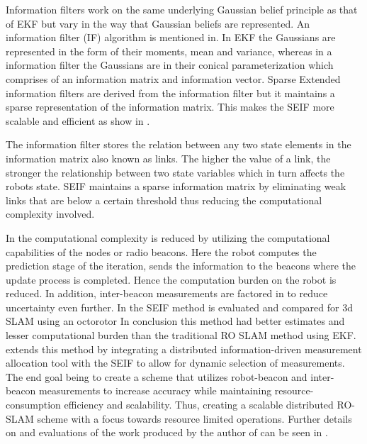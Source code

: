 \documentclass[conference]{IEEEtran}
\begin{document}
	Information filters work on the same underlying Gaussian belief principle as that of EKF but vary in the way that Gaussian beliefs are represented. An information filter (IF) algorithm is mentioned in\cite{Torres-Gonzalez2014}. In EKF the Gaussians are represented in the form of their moments, mean and variance, whereas in a information filter the Gaussians are in their conical parameterization which comprises of an information matrix and information vector. 
	Sparse Extended information filters are derived from the  information filter but it maintains a sparse representation of the information matrix. This makes the SEIF more scalable and efficient as show in \cite{Torres-Gonzalez2014}.

	The information filter stores the relation between any two state elements in the information matrix also known as links. The higher the value of a link, the stronger the relationship between two state variables which in turn affects the robots state. SEIF maintains a sparse information matrix by eliminating weak links that are below a certain threshold thus reducing the computational complexity involved.

	In \cite{Torres-Gonzalez2014} the computational complexity is reduced by utilizing the computational capabilities of the nodes or radio  beacons. Here the robot computes the prediction stage of the iteration, sends the information to the beacons where the update process is completed. Hence the computation burden on the robot is reduced. In addition, inter-beacon measurements are factored in to reduce uncertainty even further. In \cite{Torres-Gonzalez2017} the SEIF method is evaluated and compared for 3d SLAM using an octorotor In conclusion this method had better estimates and lesser computational burden than the traditional RO SLAM method using EKF. \cite{Torres-Gonzalez2017a} extends this method by integrating a distributed information-driven measurement allocation tool with the SEIF to allow for dynamic selection of measurements. The end goal being to create a scheme that utilizes robot-beacon and inter-beacon measurements to increase accuracy while maintaining resource-consumption efficiency and scalability. Thus, creating a scalable distributed RO-SLAM scheme with a focus towards resource limited operations. Further details on and evaluations of the work produced by the author of \cite{Torres-Gonzalez2017,Torres-Gonzalez2017a} can be seen in \cite{Gonzalez2017}.
\end{document}
